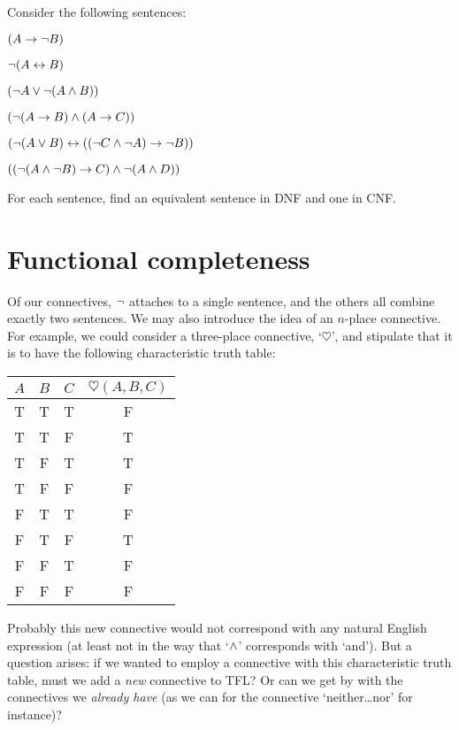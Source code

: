 \practiceproblems
\problempart
\label{pr.DNF}
Consider the following sentences:
	\begin{compactlist}
		\item $(A \rightarrow \neg B)$
		\item $\neg (A \leftrightarrow B)$
		\item $(\neg A \vee \neg (A \wedge B))$
		\item $(\neg (A \rightarrow B ) \wedge (A \rightarrow C))$
		\item $(\neg (A \vee B) \leftrightarrow ((\neg C \wedge \neg A) \rightarrow \neg B))$
		\item $((\neg (A \wedge \neg B) \rightarrow C) \wedge \neg (A \wedge D))$
	\end{compactlist}
        For each sentence, find an equivalent sentence in DNF and one in CNF.

\chapter{Functional completeness}\label{c:FunctionalCompleteness}

Of our connectives, $\neg$ attaches to a single sentence, and the others all combine exactly two sentences. We may also introduce the idea of an $n$-place connective. For example, we could consider a three-place connective, `$\heartsuit$', and stipulate that it is to have the following characteristic truth table:
\begin{center}
\begin{tabular}{c c c | c}
$A$ & $B$ & $C$ & $\heartsuit(A,B,C)$\\
\hline
 T & T & T & F \\
 T & T & F & T \\
 T & F & T & T \\
 T & F & F & F \\
 F & T & T & F \\
 F & T & F & T \\
 F & F & T & F \\
 F & F & F & F
\end{tabular}
\end{center}
Probably this new connective would not correspond with any natural English expression (at least not in the way that `$\wedge$' corresponds with `and'). But a question arises: if we wanted to employ a connective with this characteristic truth table, must we add a \emph{new} connective to TFL? Or can we get by with the connectives we \emph{already have} (as we can for the connective `neither\dots nor' for instance)?

